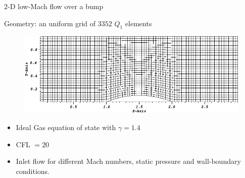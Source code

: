 \documentclass[xcolor=dvipsnames,10pt]{beamer}
\begin{document}
\begin{frame}{$2$-D low-Mach flow over a bump}
\begin{block}{Geometry: an uniform grid of $3352$ $Q_1$ elements}
\begin{figure}[H]
\centering
\includegraphics[width=\textwidth]{../figures/Hump2D_geometry.png}
\end{figure}    
\end{block}
\begin{block}{}
\begin{itemize}
\item Ideal Gas equation of state with $\gamma = 1.4$
\item CFL $= 20$
\item Inlet flow for different Mach numbers, static pressure and wall-boundary conditions.
\end{itemize}
\end{block}
\end{frame}
\end{document}
